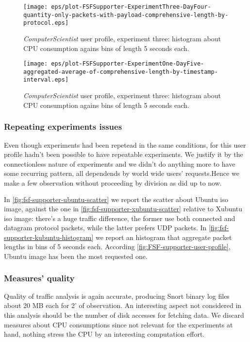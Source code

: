 \documentclass[10pt,a4paper]{article}
\begin{document}
    \begin{figure}
      \centering
      \texttt{[image: eps/plot-FSFSupporter-ExperimentThree-DayFour-quantity-only-packets-with-payload-comprehensive-length-by-protocol.eps]}
      \caption{\emph{ComputerScientist} user profile, experiment
        three: histogram about CPU consumption agains bins of length 5
        seconds each.}
      \label{fig:fsf-supporter-xubuntu-scatter}
    \end{figure}

    \begin{figure}
      \centering
      \texttt{[image: eps/plot-FSFSupporter-ExperimentOne-DayFive-aggregated-average-of-comprehensive-length-by-timestamp-interval.eps]}
      \caption{\emph{ComputerScientist} user profile, experiment
        three: histogram about CPU consumption agains bins of length 5
        seconds each.}
      \label{fig:fsf-supporter-kubuntu-histogram}
    \end{figure}

    \subsubsection*{Repeating experiments issues}
    
    Even though experiments had been repetead in the same conditions,
    for this user profile hadn't been possible to have repeatable
    experiments. We justify it by the connectionless nature of
    experiments and we didn't do anything more to have some recurring
    pattern, all dependends by world wide users' requests.Hence we
    make a few observation without proceeding by division as did up to
    now.

    In
    \autoref{fig:fsf-supporter-ubuntu-scatter}
    we report the scatter about Ubuntu iso image, against the one in
    \autoref{fig:fsf-supporter-xubuntu-scatter} relative to Xubuntu iso
    image: there's a huge traffic difference, the former use both
    connected and datagram protocol packets, while the latter prefers
    UDP packets. In \autoref{fig:fsf-supporter-kubuntu-histogram} we
    report an histogram that aggregate packet lengths in bins of 5
    seconds each. According \autoref{fig:FSF-supporter-user-profile},
    Ubuntu image has been the most requested one.

    \subsubsection*{Measures' quality}
    Quality of traffic analysis is again accurate, producing Snort
    binary log files about 20 MB each for 2' of observation. An
    interesting aspect not considered in this analysis should be the
    number of disk accesses for fetching data. We discard measures
    about CPU consumptions since not relevant for the experiments at
    hand, nothing stress the CPU by an interesting computation effort.
\end{document}
